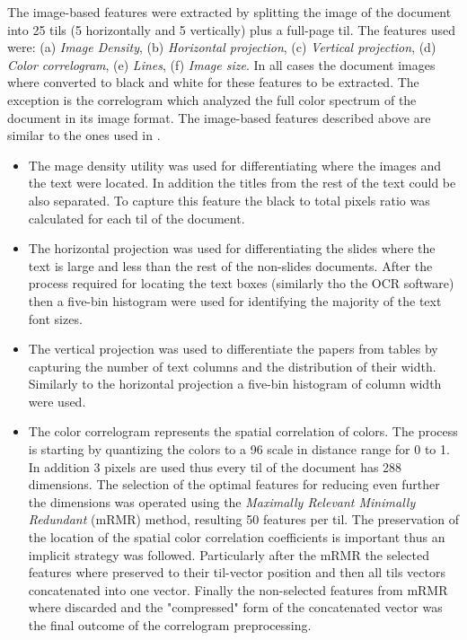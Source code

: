 The image-based features were extracted by splitting the image of the document into 25 tils (5 horizontally and 5 vertically) plus a full-page til. The features used were: (a) \textit{Image Density}, (b) \textit{Horizontal projection}, (c) \textit{Vertical projection}, (d) \textit{Color correlogram}, (e) \textit{Lines}, (f) \textit{Image size}. In all cases the document images where converted to black and white for these features to be extracted. The exception is the correlogram which analyzed the full color spectrum of the document in its image format. The image-based features described above are similar to the ones used in \parencite{clark2014you}.

\begin{itemize}
\item The mage density utility was used for differentiating where the images and the text were located. In addition the titles from the rest of the text could be also separated. To capture this feature the black to total pixels ratio was calculated for each til of the document. 
\item The horizontal projection was used for differentiating the slides where the text is large and less than the rest of the non-slides documents. After the process required for locating the text boxes (similarly tho the OCR software) then a five-bin histogram were used for identifying the majority of the text font sizes.
\item The vertical projection was used to differentiate the papers from tables by capturing the number of text columns and the distribution of their width. Similarly to the horizontal projection a five-bin histogram of column width were used.
\item The color correlogram represents the spatial correlation of colors. The process is starting by quantizing the colors to a 96 scale in distance range for 0 to 1. In addition 3 pixels are used thus every til of the document has 288 dimensions. The selection of the optimal features for reducing even further the dimensions was operated using the \textit{Maximally Relevant Minimally Redundant} (mRMR) method, resulting 50 features per til. The preservation of the location of the spatial color correlation coefficients is important thus an implicit strategy was followed. Particularly after the mRMR the selected features where preserved to their til-vector position and then all tils vectors concatenated into one vector. Finally the non-selected features from mRMR where discarded and the "compressed" form of the concatenated vector was the final outcome of the correlogram preprocessing.

\end{itemize}

